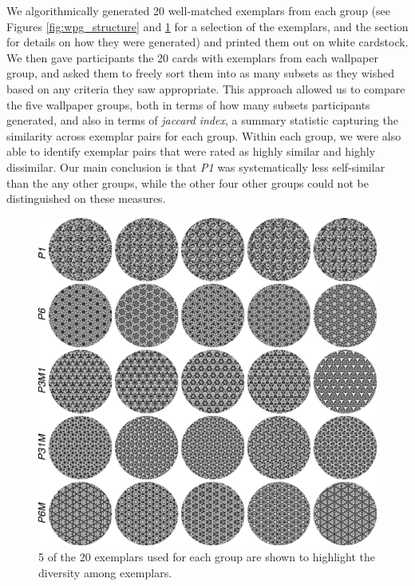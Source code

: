\documentclass[11pt, twoside]{article}
\begin{document}
We algorithmically generated 20 well-matched exemplars from each group (see Figures \ref{fig:wpg_structure} and \ref{fig:wpg_exemplars} for a selection of the exemplars, and the  section for details on how they were generated) and printed them out on white cardstock. We then gave participants the 20 cards with exemplars from each wallpaper group, and asked them to freely sort them into as many subsets as they wished based on any criteria they saw appropriate. This approach allowed us to compare the five wallpaper groups, both in terms of how many subsets participants generated, and also in terms of \textit{jaccard index}, a summary statistic capturing the similarity across exemplar pairs for each group. Within each group, we were also able to identify exemplar pairs that were rated as highly similar and highly dissimilar. Our main conclusion is that \textit{P1} was systematically less self-similar than the any other groups, while the other four other groups could not be distinguished on these measures.
\begin{figure}[H]
	\centering
	\includegraphics[width=\linewidth]{./figures//wpg_exemplars.pdf}
	\caption{5 of the 20 exemplars used for each group are shown to highlight the diversity among exemplars.}
	\label{fig:wpg_exemplars}
\end{figure}
\end{document}
